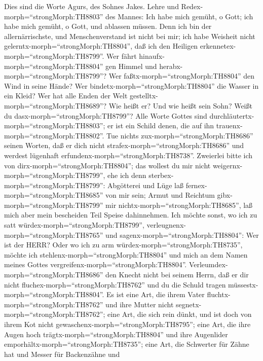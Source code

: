  Dies sind die Worte Agurs, des Sohnes Jakes. Lehre und
Redex-morph=``strongMorph:TH8803'' des Mannes: Ich habe mich gemüht, o
Gott; ich habe mich gemüht, o Gott, und ablassen müssen. 
Denn ich bin der allernärrischste, und Menschenverstand ist nicht bei
mir;  ich habe Weisheit nicht
gelerntx-morph=``strongMorph:TH8804'', daß ich den Heiligen
erkennetex-morph=``strongMorph:TH8799''.  Wer fährt
hinaufx-morph=``strongMorph:TH8804'' gen Himmel und
herabx-morph=``strongMorph:TH8799''? Wer
faßtx-morph=``strongMorph:TH8804'' den Wind in seine Hände? Wer
bindetx-morph=``strongMorph:TH8804'' die Wasser in ein Kleid? Wer hat
alle Enden der Welt gestelltx-morph=``strongMorph:TH8689''? Wie heißt
er? Und wie heißt sein Sohn? Weißt du dasx-morph=``strongMorph:TH8799''?
 Alle Worte Gottes sind
durchläutertx-morph=``strongMorph:TH8803''; er ist ein Schild denen, die
auf ihn trauenx-morph=``strongMorph:TH8802''.  Tue nichts
zux-morph=``strongMorph:TH8686'' seinen Worten, daß er dich nicht
strafex-morph=``strongMorph:TH8686'' und werdest lügenhaft
erfundenx-morph=``strongMorph:TH8738''.  Zweierlei bitte ich
von dirx-morph=``strongMorph:TH8804''; das wollest du mir nicht
weigernx-morph=``strongMorph:TH8799'', ehe ich denn
sterbex-morph=``strongMorph:TH8799'':  Abgötterei und Lüge
laß fernex-morph=``strongMorph:TH8685'' von mir sein; Armut und Reichtum
gibx-morph=``strongMorph:TH8799'' mir
nichtx-morph=``strongMorph:TH8685'', laß mich aber mein bescheiden Teil
Speise dahinnehmen.  Ich möchte sonst, wo ich zu satt
würdex-morph=``strongMorph:TH8799'',
verleugnenx-morph=``strongMorph:TH8765'' und
sagenx-morph=``strongMorph:TH8804'': Wer ist der HERR? Oder wo ich zu
arm würdex-morph=``strongMorph:TH8735'', möchte ich
stehlenx-morph=``strongMorph:TH8804'' und mich an dem Namen meines
Gottes vergreifenx-morph=``strongMorph:TH8804''. 
Verleumdex-morph=``strongMorph:TH8686'' den Knecht nicht bei seinem
Herrn, daß er dir nicht fluchex-morph=``strongMorph:TH8762'' und du die
Schuld tragen müssestx-morph=``strongMorph:TH8804''.  Es
ist eine Art, die ihrem Vater fluchtx-morph=``strongMorph:TH8762'' und
ihre Mutter nicht segnetx-morph=``strongMorph:TH8762''; 
eine Art, die sich rein dünkt, und ist doch von ihrem Kot nicht
gewaschenx-morph=``strongMorph:TH8795'';  eine Art, die
ihre Augen hoch trägtx-morph=``strongMorph:TH8804'' und ihre Augenlider
emporhältx-morph=``strongMorph:TH8735'';  eine Art, die
Schwerter für Zähne hat und Messer für Backenzähne und
